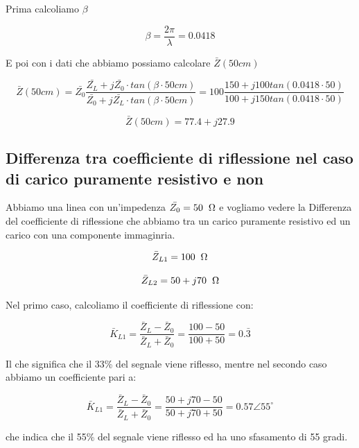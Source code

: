 \documentclass{article}
\begin{document}
    Prima calcoliamo $\beta$

    \begin{equation*}
        \beta = \frac{2 \pi}{\lambda} = 0.0418
    \end{equation*}

    E poi con i dati che abbiamo possiamo calcolare $\bar{Z}(50 cm)$

    \begin{equation*}
        \bar{Z}(50 cm) = \bar{Z_0} \frac{
            \bar{Z_L} + j \bar{Z_0} \cdot tan(\beta \cdot 50 cm)
        }{
            \bar{Z_0} + j \bar{Z_L} \cdot tan(\beta \cdot 50 cm)
        } = 100 \frac{
            150 + j 100 tan(0.0418 \cdot 50)
        }{
            100 + j 150 tan(0.0418 \cdot 50)
        }
    \end{equation*}

    \begin{equation*}
        \bar{Z}(50 cm) = 77.4 + j27.9
    \end{equation*}

    \subsection{Differenza tra coefficiente di riflessione nel caso di carico puramente resistivo e non}

    Abbiamo una linea con un'impedenza $\bar{Z_0} = 50 \hspace{0.2cm} \Omega$ e vogliamo vedere la Differenza
    del coefficiente di riflessione che abbiamo tra un carico puramente resistivo ed un carico con una componente
    immaginria.

    \begin{equation*}
        \bar{Z}_{L1} = 100 \hspace{0.2cm} \Omega
    \end{equation*}

    \begin{equation*}
        \bar{Z}_{L2} = 50 + j70 \hspace{0.2cm} \Omega
    \end{equation*}

    Nel primo caso, calcoliamo il coefficiente di riflessione con:

    \begin{equation*}
        \bar{K}_{L1} = \frac{
            \bar{Z}_L - \bar{Z}_0
        }{
            \bar{Z}_L + \bar{Z}_0
        } = \frac{
            100 - 50
        }{
            100 + 50
        } = 0.\bar{3}
    \end{equation*}

    Il che significa che il 33\% del segnale viene riflesso, mentre nel secondo caso abbiamo un coefficiente pari a:
    
    \begin{equation*}
        \bar{K}_{L1} = \frac{
            \bar{Z}_L - \bar{Z}_0
        }{
            \bar{Z}_L + \bar{Z}_0
        } = \frac{
            50 + j70 - 50
        }{
            50 + j70 + 50
        } = 0.57 \angle 55^{\circ}
    \end{equation*}

    che indica che il 55\% del segnale viene riflesso ed ha uno sfasamento di 55 gradi.
\end{document}
